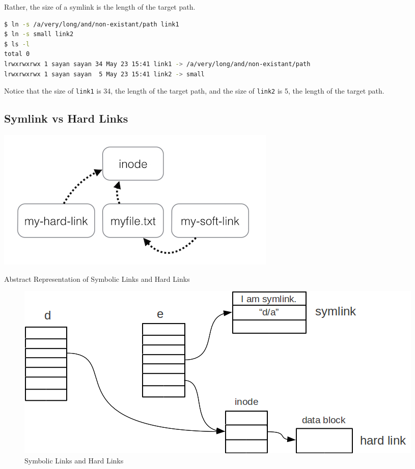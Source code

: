 Rather, the size of a symlink is the length of the target path.

\begin{lstlisting}[language=bash]
$ ln -s /a/very/long/and/non-existant/path link1
$ ln -s small link2
$ ls -l
total 0
lrwxrwxrwx 1 sayan sayan 34 May 23 15:41 link1 -> /a/very/long/and/non-existant/path
lrwxrwxrwx 1 sayan sayan  5 May 23 15:41 link2 -> small
\end{lstlisting}

Notice that the size of \texttt{link1} is 34, the length of the target path, and the size of \texttt{link2} is 5, the length of the target path.

\subsection{Symlink vs Hard Links}

\begin{marginfigure}
  \includegraphics{images/png/soft-and-hard.png}
  \caption[Abstract Representation of Symbolic Links and Hard Links]{Abstract Representation of Symbolic Links and Hard Links}
\end{marginfigure}

\begin{figure}[hb]
  \includegraphics{images/png/soft-and-hard2.png}
  \caption[Symbolic Links and Hard Links]{Symbolic Links and Hard Links}
\end{figure}

